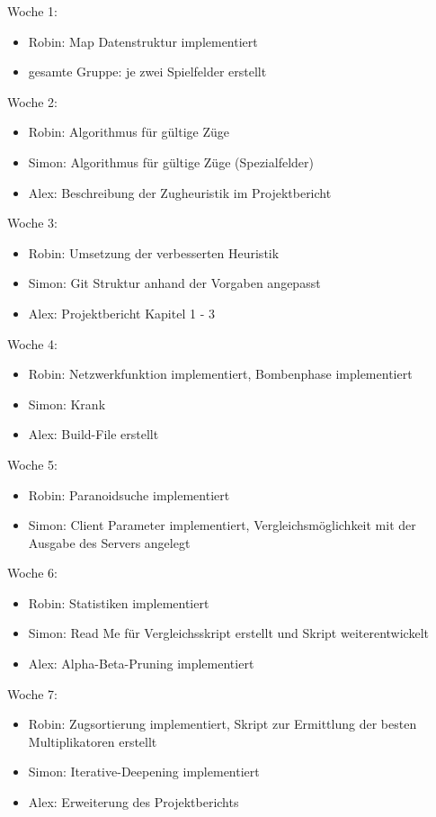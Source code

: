 \documentclass[12pt,a4paper,bibliography=totocnumbered,listof=totocnumbered]{article}
\begin{document}
Woche 1:
\begin{itemize}
\item Robin: Map Datenstruktur implementiert
\item gesamte Gruppe: je zwei Spielfelder erstellt
\end{itemize}
Woche 2:
\begin{itemize}
\item Robin: Algorithmus für gültige Züge
\item Simon: Algorithmus für gültige Züge (Spezialfelder)
\item Alex: Beschreibung der Zugheuristik im Projektbericht
\end{itemize}
Woche 3:
\begin{itemize}
\item Robin: Umsetzung der verbesserten Heuristik
\item Simon: Git Struktur anhand der Vorgaben angepasst
\item Alex: Projektbericht Kapitel 1 - 3
\end{itemize}
Woche 4:
\begin{itemize}
\item Robin: Netzwerkfunktion implementiert, Bombenphase implementiert
\item Simon: Krank
\item Alex: Build-File erstellt
\end{itemize}
Woche 5:
\begin{itemize}
\item Robin: Paranoidsuche implementiert
\item Simon: Client Parameter implementiert, Vergleichsmöglichkeit mit der Ausgabe des Servers angelegt
\end{itemize}
Woche 6:
\begin{itemize}
\item Robin: Statistiken implementiert
\item Simon: Read Me für Vergleichsskript erstellt und Skript weiterentwickelt
\item Alex: Alpha-Beta-Pruning implementiert
\end{itemize}
Woche 7:
\begin{itemize}
\item Robin: Zugsortierung implementiert, Skript zur Ermittlung der besten Multiplikatoren erstellt
\item Simon: Iterative-Deepening implementiert
\item Alex: Erweiterung des Projektberichts
\end{itemize}
\end{document}
